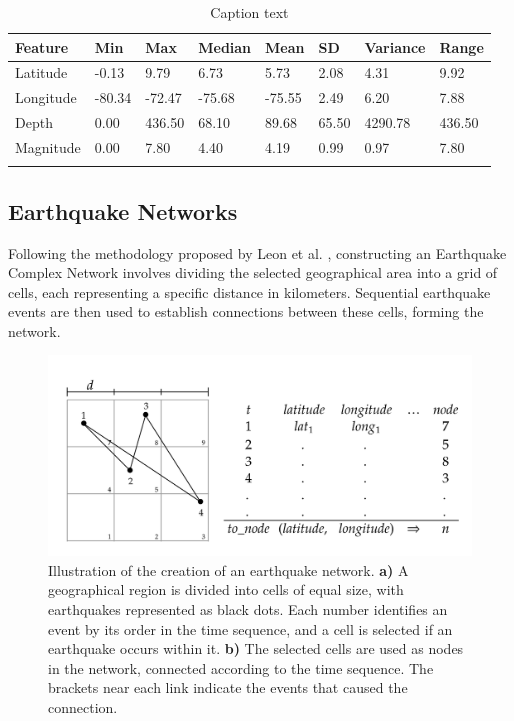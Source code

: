 \documentclass[sn-mathphys-num]{sn-jnl}
\begin{document}
\begin{table}[h]
    \caption{Caption text}\label{tab1}%
    \begin{tabular}{@{}llllllll@{}}
        \toprule
        Feature   & Min    & Max    & Median & Mean   & SD    & Variance & Range  \\
        \midrule
        Latitude  & -0.13  & 9.79   & 6.73   & 5.73   & 2.08  & 4.31     & 9.92   \\
        Longitude & -80.34 & -72.47 & -75.68 & -75.55 & 2.49  & 6.20     & 7.88   \\
        Depth     & 0.00   & 436.50 & 68.10  & 89.68  & 65.50 & 4290.78  & 436.50 \\
        Magnitude & 0.00   & 7.80   & 4.40   & 4.19   & 0.99  & 0.97     & 7.80   \\
        \botrule
    \end{tabular}
\end{table}


\subsection{Earthquake Networks}\label{earthquake_networks}
Following the methodology proposed by Leon et al. \cite{leon_modeling_2018}, constructing an Earthquake Complex Network involves dividing the selected geographical area into a grid of cells, each representing a specific distance in kilometers. Sequential earthquake events are then used to establish connections between these cells, forming the network.

\begin{figure}[H]
    \includegraphics[width=1\textwidth]{img/diagram-20250202.png}
    \caption{Illustration of the creation of an earthquake network. \textbf{a)} A geographical region is divided into cells of equal size, with earthquakes represented as black dots. Each number identifies an event by its order in the time sequence, and a cell is selected if an earthquake occurs within it. \textbf{b)} The selected cells are used as nodes in the network, connected according to the time sequence. The brackets near each link indicate the events that caused the connection.\label{fig2}}
\end{figure}
\unskip
\end{document}
